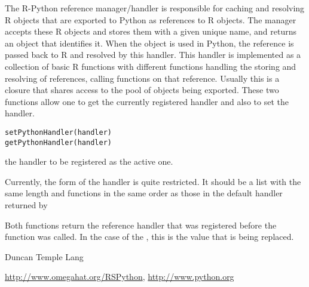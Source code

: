 \begin{Description}\relax
The R-Python reference manager/handler is responsible for caching and
resolving R objects that are exported to Python as references to R
objects. The manager accepts these R objects and stores them with a
given unique name, and returns an object that identifies it. When the
object is used in Python, the reference is passed back to R and
resolved by this handler.  This handler is implemented as a collection
of basic R functions with different functions handling the storing and
resolving of references, calling functions on that reference.  Usually
this is a closure that shares access to the pool of objects being
exported.  These two functions allow one to get the currently
registered handler and also to set the handler.\end{Description}
\begin{Usage}
\begin{verbatim}
setPythonHandler(handler)
getPythonHandler(handler)
\end{verbatim}
\end{Usage}
\begin{Arguments}
\begin{ldescription}
\item[\code{handler}] the handler to be registered as the active one.
\end{ldescription}
\end{Arguments}
\begin{Details}\relax
Currently, the form of the handler is quite restricted.
It should be a list with the same length and functions 
in the same order as those in the default handler
returned by \end{Details}
\begin{Value}
Both functions return the reference handler that was registered
before the function was called. In the case of the
, this is the value that is being replaced.\end{Value}
\begin{Author}\relax
Duncan Temple Lang\end{Author}
\begin{References}\relax
\url{http://www.omegahat.org/RSPython},
\url{http://www.python.org}\end{References}
\begin{SeeAlso}\relax
{}\end{SeeAlso}
\begin{Examples}
\begin{ExampleCode}

\end{ExampleCode}
\end{Examples}

